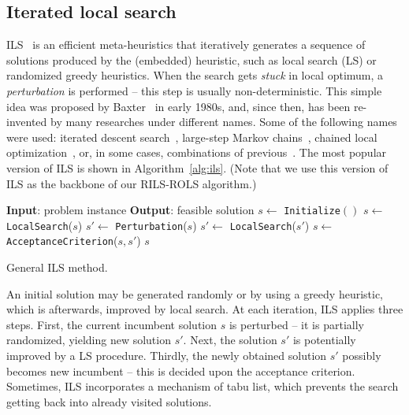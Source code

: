 \documentclass{bmcart}
\begin{document}
\subsection{Iterated local search}
ILS~\cite{lourencco2003iterated} is an efficient meta-heuristics that iteratively generates a sequence of solutions produced by the (embedded) heuristic, such as local search (LS) or randomized greedy heuristics. When the search gets \emph{stuck} in local optimum, a \emph{perturbation} is performed -- this step is usually non-deterministic. This simple idea was proposed by Baxter~\cite{baxter1981local} in early 1980s, and, since then, has been  re-invented by many researches under different names. Some of the following names were used: iterated descent search~\cite{baum1998iterated}, large-step
Markov chains~\cite{martin1991large}, chained local optimization~\cite{martin1996combining}, or, in some cases, combinations of previous~\cite{applegate2003chained}. The most popular version of ILS is shown in Algorithm~\ref{alg:ils}. (Note that we use this version of ILS as the backbone of our \textsc{RILS}-\textsc{ROLS} algorithm.)

\begin{algorithm}
	\begin{algorithmic}[1] 
		\State \textbf{Input}: problem instance
		\State \textbf{Output}: feasible solution 
		\State $s \gets$ \texttt{Initialize}$()$
		\State  $s \gets$ \texttt{LocalSearch}($s$)
		\State  $s' \gets$ \texttt{Perturbation}($s$)
		\State  $s' \gets$ \texttt{LocalSearch}($s'$)
		\State  $ s \gets$ \texttt{AcceptanceCriterion}($s, s'$)
		\EndWhile
		\State \Return $s$
	\end{algorithmic}
	\caption{General ILS method.}
	\label{alg:ils}
\end{algorithm}  

An initial solution may be generated randomly or by using a greedy heuristic, which is afterwards, improved by local search. At each iteration, ILS applies three steps. First, the current incumbent solution $s$ is perturbed -- it is partially randomized, yielding new solution $s'$. Next, the solution $s'$ is potentially improved by a LS procedure. Thirdly, the newly obtained solution $s'$  possibly becomes new incumbent -- this is decided upon the acceptance criterion. Sometimes, ILS incorporates a mechanism of tabu list, which prevents the search getting back into already visited solutions.  		 
\end{document}
